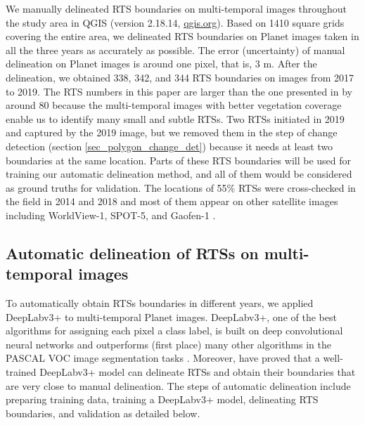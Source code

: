 \documentclass[authoryear,preprint,review,12pt]{elsarticle}
\begin{document}
We manually delineated RTS boundaries on multi-temporal images throughout the study area in QGIS (version 2.18.14, \url{qgis.org}). 
Based on 1410 square grids covering the entire area, %
we delineated RTS boundaries on Planet images taken in all the three years as accurately as possible. 
The error (uncertainty) of manual delineation on Planet images is around one pixel, that is, 3 m. 
After the delineation, we obtained 338, 342, and 344 RTS boundaries on images from 2017 to 2019. 
The RTS numbers in this paper are larger than the one presented in \cite{huang2020using} by around 80 because the multi-temporal images with better vegetation coverage enable us to identify many small and subtle RTSs. 
Two RTSs initiated in 2019 and captured by the 2019 image, but we removed them in the step of change detection (section \ref{sec_polygon_change_det}) because it needs at least two boundaries at the same location. 
Parts of these RTS boundaries will be used for training our automatic delineation method, and all of them would be considered as ground truths for validation. 
The locations of 55\% RTSs were cross-checked in the field in 2014 and 2018 and most of them  appear on other satellite images including WorldView-1, SPOT-5, and Gaofen-1 \citep{luo2019recent}. 
%



\subsection{Automatic delineation of RTSs on multi-temporal images}
\label{sec_auto_delineating}

To automatically obtain RTSs boundaries in different years, we applied DeepLabv3+ to multi-temporal Planet images. 
DeepLabv3+, one of the best algorithms for assigning each pixel a class label, is built on deep convolutional neural networks \citep{chen2018encoder-decoder} and outperforms (first place) many other algorithms in the PASCAL VOC image segmentation tasks \citep{everingham2015The}.
Moreover, \cite{huang2020using} have proved that a well-trained DeepLabv3+ model can delineate RTSs and obtain their boundaries that are very close to manual delineation.
The steps of automatic delineation include preparing training data, training a DeepLabv3+ model, delineating RTS boundaries, and validation as detailed below. 
\end{document}
